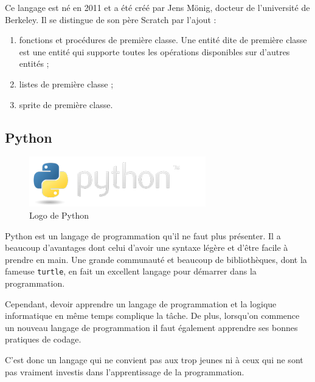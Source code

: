Ce langage est né en 2011 et a été créé par Jens Mönig, docteur de l'université de Berkeley. Il se distingue de son père Scratch par l'ajout :
\begin{enumerate}
\item fonctions et procédures de première classe. Une entité dite de première classe est une entité qui supporte toutes les opérations disponibles sur d'autres entités ; %
\item listes de première classe ;
\item \gls{sprite} de première classe.
\end{enumerate}

\subsection{Python}

\begin{figure}[!ht]
  \begin{center}
    \includegraphics[scale=0.4]{content/5-related_work/images/python}
    \caption{Logo de Python}
    \label{fig:python}
  \end{center}
\end{figure}

Python \cite{python} est un langage de programmation qu'il ne faut plus présenter. Il a beaucoup d'avantages dont celui d'avoir une syntaxe légère et d'être facile à prendre en main. Une grande communauté et beaucoup de bibliothèques, dont la fameuse \texttt{turtle}, en fait un excellent langage pour démarrer dans la programmation.

Cependant, devoir apprendre un langage de programmation et la logique informatique en même temps complique la tâche. De plus, lorsqu'on commence un nouveau langage de programmation il faut également apprendre ses bonnes pratiques de codage. %

C'est donc un langage qui ne convient pas aux trop jeunes ni à ceux qui ne sont pas vraiment investis dans l'apprentissage de la programmation.
